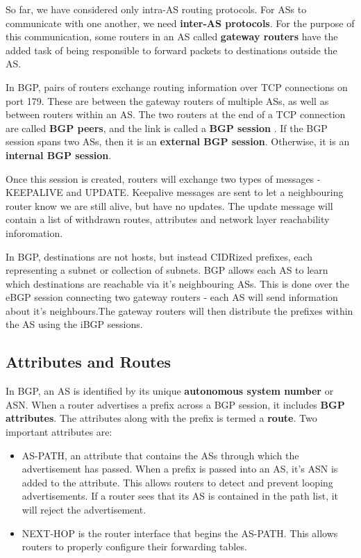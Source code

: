 \documentclass[12pt,letterpaper]{book}
\theoremstyle{definition}
\begin{document}
So far, we have considered only intra-AS routing protocols. For ASs to communicate with one another, we need \textbf{inter-AS protocols}. For the purpose of this communication, some routers in an AS called \textbf{gateway routers}  have the added task of being responsible to forward packets to destinations outside the AS.

In BGP, pairs of routers exchange routing information over TCP connections on port 179. These are between the gateway routers of multiple ASs, as well as between routers within an AS. The two routers at the end of a TCP connection are called \textbf{BGP peers}, and the link is called a \textbf{BGP session} . If the BGP session spans two ASs, then it is an \textbf{external BGP session}. Otherwise, it is an \textbf{internal BGP session}.

Once this session is created, routers will exchange two types of messages - KEEPALIVE and UPDATE. Keepalive messages are sent to let a neighbouring router know we are still alive, but have no updates. The update message will contain a list of withdrawn routes, attributes and network layer reachability inforomation.

In BGP, destinations are not hosts, but instead CIDRized prefixes, each representing a subnet or collection of subnets. BGP allows each AS to learn which destinations are reachable via it's neighbouring ASs. This is done over the eBGP session connecting two gateway routers - each AS will send information about it's neighbours.The gateway routers will then distribute the prefixes within the AS using the iBGP sessions.

\subsection{Attributes and Routes}

In BGP, an AS is identified by its unique \textbf{autonomous system number} or ASN. When a router advertises a prefix across a BGP session, it includes \textbf{BGP attributes}. The attributes along with the prefix is termed a \textbf{route}. Two important attributes are:

\begin{itemize}
  \item AS-PATH, an attribute that contains the ASs through which the advertisement has passed. When a prefix is passed into an AS, it's ASN is added to the attribute. This allows routers to detect and prevent looping advertisements. If a router sees that its AS is contained in the path list, it will reject the advertisement.
  \item  NEXT-HOP is the router interface that begins the AS-PATH. This allows routers to properly configure their forwarding tables.
\end{itemize}
\end{document}
